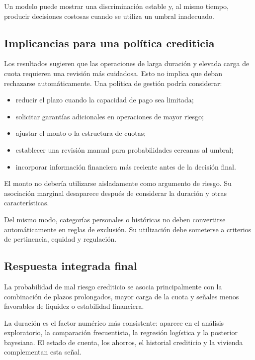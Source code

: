 Un modelo puede mostrar una discriminación estable y, al mismo tiempo,
producir decisiones costosas cuando se utiliza un umbral inadecuado.

\subsection{Implicancias para una política crediticia}

Los resultados sugieren que las operaciones de larga duración y elevada
carga de cuota requieren una revisión más cuidadosa. Esto no implica que
deban rechazarse automáticamente. Una política de gestión podría
considerar:

\begin{itemize}
    \item reducir el plazo cuando la capacidad de pago sea limitada;

    \item solicitar garantías adicionales en operaciones de mayor riesgo;

    \item ajustar el monto o la estructura de cuotas;

    \item establecer una revisión manual para probabilidades cercanas al
    umbral;

    \item incorporar información financiera más reciente antes de la
    decisión final.
\end{itemize}

El monto no debería utilizarse aisladamente como argumento de riesgo. Su
asociación marginal desaparece después de considerar la duración y otras
características.

Del mismo modo, categorías personales o históricas no deben convertirse
automáticamente en reglas de exclusión. Su utilización debe someterse a
criterios de pertinencia, equidad y regulación.

\subsection{Respuesta integrada final}

La probabilidad de mal riesgo crediticio se asocia principalmente con la
combinación de plazos prolongados, mayor carga de la cuota y señales menos
favorables de liquidez o estabilidad financiera.

La duración es el factor numérico más consistente: aparece en el análisis
exploratorio, la comparación frecuentista, la regresión logística y la
posterior bayesiana. El estado de cuenta, los ahorros, el historial
crediticio y la vivienda complementan esta señal.

